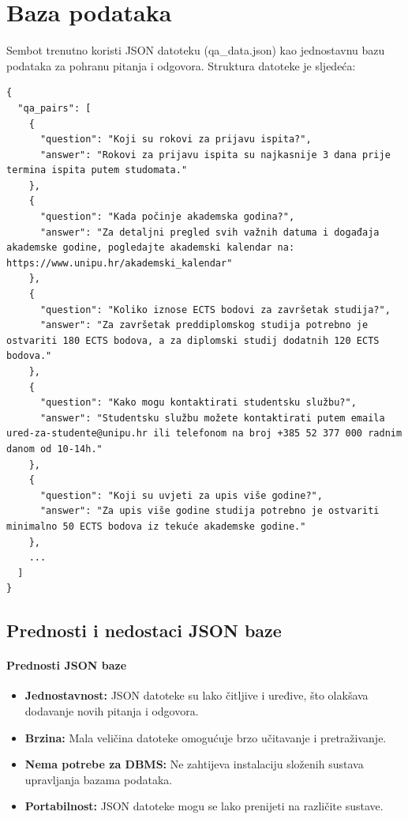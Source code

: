 \section{Baza podataka}
Sembot trenutno koristi JSON datoteku (qa\_data.json) kao jednostavnu bazu podataka za pohranu pitanja i odgovora. Struktura datoteke je sljedeća:

\begin{verbatim}
{
  "qa_pairs": [
    {
      "question": "Koji su rokovi za prijavu ispita?",
      "answer": "Rokovi za prijavu ispita su najkasnije 3 dana prije termina ispita putem studomata."
    },
    {
      "question": "Kada počinje akademska godina?",
      "answer": "Za detaljni pregled svih važnih datuma i događaja akademske godine, pogledajte akademski kalendar na: https://www.unipu.hr/akademski_kalendar"
    },
    {
      "question": "Koliko iznose ECTS bodovi za završetak studija?",
      "answer": "Za završetak preddiplomskog studija potrebno je ostvariti 180 ECTS bodova, a za diplomski studij dodatnih 120 ECTS bodova."
    },
    {
      "question": "Kako mogu kontaktirati studentsku službu?",
      "answer": "Studentsku službu možete kontaktirati putem emaila ured-za-studente@unipu.hr ili telefonom na broj +385 52 377 000 radnim danom od 10-14h."
    },
    {
      "question": "Koji su uvjeti za upis više godine?",
      "answer": "Za upis više godine studija potrebno je ostvariti minimalno 50 ECTS bodova iz tekuće akademske godine."
    },
    ...
  ]
}
\end{verbatim}

\subsection{Prednosti i nedostaci JSON baze}

\paragraph{Prednosti JSON baze}
\begin{itemize}
    \item \textbf{Jednostavnost:} JSON datoteke su lako čitljive i uređive, što olakšava dodavanje novih pitanja i odgovora.
    \item \textbf{Brzina:} Mala veličina datoteke omogućuje brzo učitavanje i pretraživanje.
    \item \textbf{Nema potrebe za DBMS:} Ne zahtijeva instalaciju složenih sustava upravljanja bazama podataka.
    \item \textbf{Portabilnost:} JSON datoteke mogu se lako prenijeti na različite sustave.
\end{itemize}

